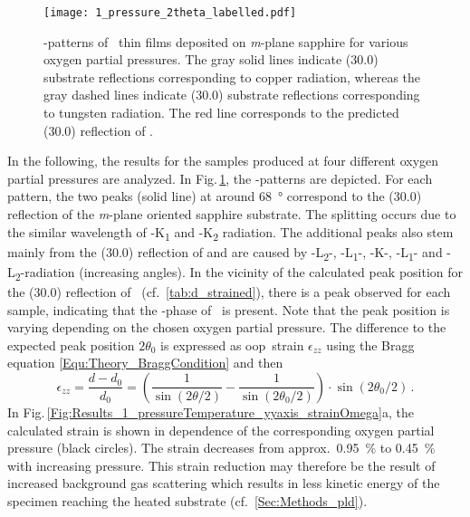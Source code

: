 \begin{figure}
    \centering
    \texttt{[image: 1\_pressure\_2theta\_labelled.pdf]}
    \caption{
        \thetaomega-patterns of \cro\ thin films deposited on \textit{m}-plane sapphire for various oxygen partial pressures.
        The gray solid lines indicate (30.0) substrate reflections corresponding to copper radiation, whereas the gray dashed lines indicate (30.0) substrate reflections corresponding to tungsten radiation.
        The red line corresponds to the predicted (30.0) reflection of \cro.}
    \label{Fig:Results_1_pressure_2theta}
\end{figure}
In the following, the results for the samples produced at four different oxygen partial pressures are analyzed.
In Fig.\,\ref{Fig:Results_1_pressure_2theta}, the \thetaomega-patterns are depicted.
For each pattern, the two peaks (solid line) at around \qty{68}{\degree} correspond to the (30.0) reflection of the \textit{m}-plane oriented sapphire substrate.
The splitting occurs due to the similar wavelength of -K\textalpha\textsubscript{1} and -K\textalpha\textsubscript{2} radiation.
The additional peaks also stem mainly from the (30.0) reflection of  and are caused by
-L\textbeta\textsubscript{2}-,
-L\textbeta\textsubscript{1}-,
-K\textbeta-,
-L\textalpha\textsubscript{1}- and
-L\textalpha\textsubscript{2}-radiation (increasing angles).
In the vicinity of the calculated peak position for the (30.0) reflection of \cro\ (cf.~\ref{tab:d_strained}), there is a peak observed for each sample, indicating that the \textalpha-phase of \cro\ is present.
Note that the peak position is varying depending on the chosen oxygen partial pressure.
The difference to the expected peak position $2\theta_0$ is expressed as \gls{oop}\ strain $\epsilon_{zz}$ using the Bragg equation \eqref{Equ:Theory_BraggCondition} and then
\begin{equation}
    \label{Equ:Results_oop_strain_def}
    \epsilon_{zz}
    =\frac{d-d_0}{d_0}
    =\left(\frac{1}{\sin(2\theta/2)}-\frac{1}{\sin(2\theta_0/2)}\right)
    \cdot\sin(2\theta_0/2)\,.
\end{equation}
In Fig.\,\ref{Fig:Results_1_pressureTemperature_yyaxis_strainOmega}a, the calculated strain is shown in dependence of the corresponding oxygen partial pressure (black circles).
The strain decreases from approx.\ \qty{0.95}{\percent} to \qty{0.45}{\percent} with increasing pressure.
This strain reduction may therefore be the result of increased background gas scattering which results in less kinetic energy of the specimen reaching the heated substrate (cf.~\ref{Sec:Methods_pld}).
